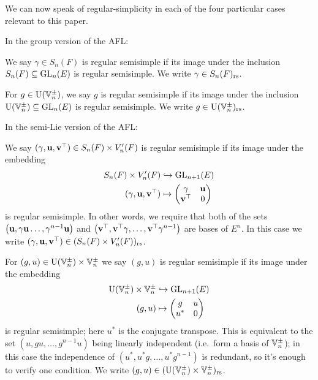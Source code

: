 We can now speak of regular-simplicity in each of the four
particular cases relevant to this paper.
\begin{definition}
  In the group version of the AFL:
  \begin{itemize}
    \ii We say $\gamma \in S_n(F)$ is regular semisimple
    if its image under the inclusion $S_n(F) \subseteq \operatorname{GL}_n(E)$ is regular semisimple.
    We write $\gamma \in S_n(F)_{\mathrm{rs}}$.

    \ii For $g \in \operatorname{U}(\mathbb V_n^\pm)$,
    we say $g$ is regular semisimple
    if its image under the inclusion $\operatorname{U}(\mathbb V_n^\pm) \subseteq \operatorname{GL}_n(E)$ is regular semisimple.
    We write $g \in \operatorname{U}(\mathbb V_n^\pm)_{\mathrm{rs}}$.
  \end{itemize}
  In the semi-Lie version of the AFL:
  \begin{itemize}
    \ii We say $(\gamma, \mathbf u, \mathbf v^\top) \in S_n(F) \times V'_n(F)$
    is regular semisimple if its image under the embedding
    \begin{equation}
      \begin{aligned}
        S_n(F) \times V'_n(F) &\hookrightarrow \operatorname{GL}_{n+1}(E) \\
        (\gamma, \mathbf u, \mathbf v^\top) &\mapsto \begin{pmatrix} \gamma & \mathbf u \\ \mathbf v^\top & 0 \end{pmatrix}
      \end{aligned}
      \label{eq:embed_FJ_analytic}
    \end{equation}
    is regular semisimple.
    In other words, we require that
    both of the sets
    $\left( \mathbf u, \gamma \mathbf u \dots, \gamma^{n-1}\mathbf u \right)$
    and
    $\left( \mathbf v^\top, \mathbf v^\top \gamma, \dots, \mathbf v^\top \gamma^{n-1} \right)$
    are bases of $E^n$.
    In this case we write $(\gamma, \mathbf u, \mathbf v^\top) \in (S_n(F) \times V'_n(F))_{\mathrm{rs}}$.

    \ii For $(g,u) \in \operatorname{U}(\mathbb V_n^\pm) \times \mathbb V_n^\pm$ we say $(g, u)$
    is regular semisimple if its image under the embedding
    \begin{equation}
      \begin{aligned}
        \operatorname{U}(\mathbb V_n^\pm) \times \mathbb V_n^\pm &\hookrightarrow \operatorname{GL}_{n+1}(E) \\
        (g, u) &\mapsto \begin{pmatrix} g & u \\ u^\ast & 0 \end{pmatrix}
      \end{aligned}
      \label{eq:embed_FJ_geometric}
    \end{equation}
    is regular semisimple; here $u^\ast$ is the conjugate transpose.
    This is equivalent to the set $\left(  u, gu, \dots, g^{n-1}u \right)$
    being linearly independent (i.e.\ form a basis of $\mathbb V_n^\pm$);
    in this case the independence of $\left( u^\ast, u^\ast g, \dots, u^\ast g^{n-1} \right)$
    is redundant, so it's enough to verify one condition.
    We write $(g,u) \in (\operatorname{U}(\mathbb V_n^\pm) \times \mathbb V_n^\pm)_{\mathrm{rs}}$.
  \end{itemize}
  \label{def:regular}
\end{definition}

